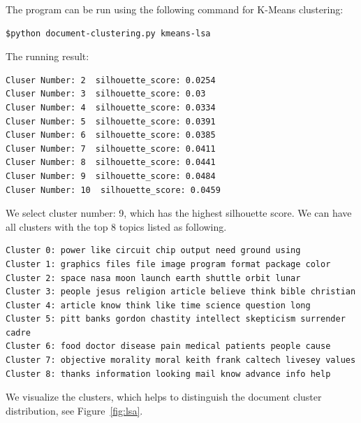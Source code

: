 \documentclass[12pt]{article}
\begin{document}
The program can be run using the following command for K-Means clustering:
\begin{lstlisting}[frame=none]
$python document-clustering.py kmeans-lsa
\end{lstlisting}
The running result:
\begin{lstlisting}[frame=single, captionpos=b, caption=Silhouette Score List, label=listing:sparql_getallindividuals,]
Cluser Number: 2  silhouette_score: 0.0254
Cluser Number: 3  silhouette_score: 0.03
Cluser Number: 4  silhouette_score: 0.0334
Cluser Number: 5  silhouette_score: 0.0391
Cluser Number: 6  silhouette_score: 0.0385
Cluser Number: 7  silhouette_score: 0.0411
Cluser Number: 8  silhouette_score: 0.0441
Cluser Number: 9  silhouette_score: 0.0484
Cluser Number: 10  silhouette_score: 0.0459
\end{lstlisting}
We select cluster number: 9, which has the highest silhouette score. We can have all clusters with the top 8 topics listed as following.
\begin{lstlisting}[frame=single, captionpos=b, caption=LSA Cluster Result, label=listing:sparql_getallindividuals,]
Cluster 0: power like circuit chip output need ground using
Cluster 1: graphics files file image program format package color
Cluster 2: space nasa moon launch earth shuttle orbit lunar
Cluster 3: people jesus religion article believe think bible christian
Cluster 4: article know think like time science question long
Cluster 5: pitt banks gordon chastity intellect skepticism surrender cadre
Cluster 6: food doctor disease pain medical patients people cause
Cluster 7: objective morality moral keith frank caltech livesey values
Cluster 8: thanks information looking mail know advance info help
\end{lstlisting}
We visualize the clusters, which helps to distinguish the document cluster distribution, see Figure~\ref{fig:lsa}.
\end{document}
